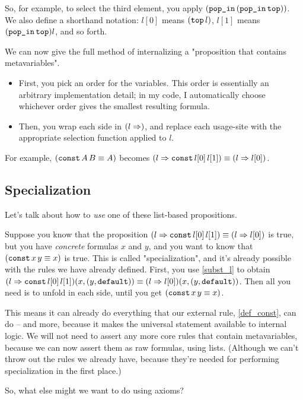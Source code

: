 \documentclass{article}
\begin{document}
  So, for example, to select the third element, you apply $(\operatorname{\texttt{pop\_in}}\, (\operatorname{\texttt{pop\_in}} \operatorname{\texttt{top}}))$. We also define a shorthand notation: $l[0]$ means $(\operatorname{\texttt{top}} l)$, $l[1]$ means $(\operatorname{\texttt{pop\_in}} \operatorname{\texttt{top}}) l$, and so forth.

  We can now give the full method of internalizing a "proposition that contains metavariables".
  
  \begin{itemize}
    \item First, you pick an order for the variables. This order is essentially an arbitrary implementation detail; in my code, I automatically choose whichever order gives the smallest resulting formula.
    \item Then, you wrap each side in $(l \Rightarrow)$, and replace each usage-site with the appropriate selection function applied to $l$.
  \end{itemize}
  
  For example, $(\operatorname{\texttt{const}} A\, B \equiv A)$ becomes $(l \Rightarrow \operatorname{\texttt{const}} l[0]\, l[1]) \equiv (l \Rightarrow l[0])$.
  
  
  \subsection{Specialization}
  
  Let's talk about how to \emph{use} one of these list-based propositions.
  
  Suppose you know that the proposition $(l \Rightarrow \operatorname{\texttt{const}} l[0]\, l[1]) \equiv (l \Rightarrow l[0])$ is true, but you have \emph{concrete} formulas $x$ and $y$, and you want to know that $(\operatorname{\texttt{const}} x\, y \equiv x)$ is true. This is called "specialization", and it's already possible with the rules we have already defined. First, you use \eqref{subst_l} to obtain $(l \Rightarrow \operatorname{\texttt{const}} l[0]\, l[1])(x,(y,\operatorname{\texttt{default}})) \equiv (l \Rightarrow l[0])(x,(y,\operatorname{\texttt{default}}))$. Then all you need is to unfold in each side, until you get $(\operatorname{\texttt{const}} x\, y \equiv x)$.
  
  This means it can already do everything that our external rule, \eqref{def_const}, can do – and more, because it makes the universal statement available to internal logic. We will not need to assert any more core rules that contain metavariables, because we can now assert them as raw formulas, using lists. (Although we can't throw out the rules we already have, because they're needed for performing specialization in the first place.)
  
  So, what else might we want to do using axioms?
  
\end{document}
